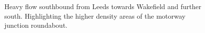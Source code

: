 	\begin{figure}
    		\centering
        		\hfill
		\caption[Wakefield M1J40 : Density line contour]{Heavy flow southbound from Leeds towards Wakefield and further south. Highlighting the higher density areas of the motorway junction roundabout.\label{fig:randd:M1J40}}
	\end{figure}
	
